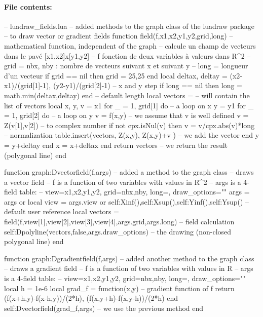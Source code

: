 \paragraph{File contents:}
\begin{Luacode}
-- luadraw_fields.lua
-- added methods to the graph class of the luadraw package
-- to draw vector or gradient fields
function field(f,x1,x2,y1,y2,grid,long)  -- mathematical function, independent of the graph
-- calcule un champ de vecteurs dans le pavé [x1,x2]x[y1,y2]
-- f fonction de deux variables à valeurs dans R^2
-- grid = {nbx, nby} : nombre de vecteurs suivant x et suivant y
-- long = longueur d'un vecteur
    if grid == nil then grid = {25,25} end
    local deltax, deltay = (x2-x1)/(grid[1]-1), (y2-y1)/(grid[2]-1) -- x and y step
    if long == nil then long = math.min(deltax,deltay) end -- default length
    local vectors = {} -- will contain the list of vectors
    local x, y, v = x1 
    for _ = 1, grid[1] do -- a loop on x
        y = y1
        for _ = 1, grid[2] do -- a loop on y
            v = f(x,y) -- we assume that v is well defined
            v = Z(v[1],v[2]) -- to complex number
            if not cpx.isNul(v) then
                v = v/cpx.abs(v)*long -- normalization
                table.insert(vectors, {Z(x,y), Z(x,y)+v} ) -- we add the vector
            end
            y = y+deltay
        end
        x = x+deltax
    end
    return vectors -- we return the result (polygonal line)
end

function graph:Dvectorfield(f,args) -- added a method to the graph class
-- draws a vector field
-- f is a function of two variables with values ​​in R^2
-- args is a 4-field table:
-- { view={x1,x2,y1,y2}, grid={nbx,nby}, long=, draw_options=""}
    args = args or {}
    local view = args.view or {self:Xinf(),self:Xsup(),self:Yinf(),self:Ysup()} -- default user reference
    local vectors = field(f,view[1],view[2],view[3],view[4],args.grid,args.long) -- field calculation
    self:Dpolyline(vectors,false,args.draw_options) -- the drawing (non-closed polygonal line)
end

function graph:Dgradientfield(f,args) -- added another method to the graph class
-- draws a gradient field
-- f is a function of two variables with values ​​in R
-- args is a 4-field table:
-- { view={x1,x2,y1,y2}, grid={nbx,nby}, long=, draw_options=""}
    local h = 1e-6
    local grad_f = function(x,y) -- gradient function of f
        return { (f(x+h,y)-f(x-h,y))/(2*h), (f(x,y+h)-f(x,y-h))/(2*h) }
    end
    self:Dvectorfield(grad_f,args) -- we use the previous method
end
\end{Luacode}

